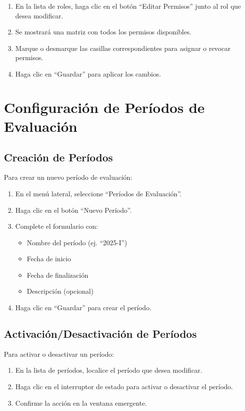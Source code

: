 \documentclass[12pt,a4paper]{book}
\begin{document}
\begin{enumerate}
    \item En la lista de roles, haga clic en el botón ``Editar Permisos'' junto al rol que desea modificar.
    \item Se mostrará una matriz con todos los permisos disponibles.
    \item Marque o desmarque las casillas correspondientes para asignar o revocar permisos.
    \item Haga clic en ``Guardar'' para aplicar los cambios.
\end{enumerate}

\section{Configuración de Períodos de Evaluación}
\subsection{Creación de Períodos}
Para crear un nuevo período de evaluación:

\begin{enumerate}
    \item En el menú lateral, seleccione ``Períodos de Evaluación''.
    \item Haga clic en el botón ``Nuevo Período''.
    \item Complete el formulario con:
    \begin{itemize}
        \item Nombre del período (ej. ``2025-I'')
        \item Fecha de inicio
        \item Fecha de finalización
        \item Descripción (opcional)
    \end{itemize}
    \item Haga clic en ``Guardar'' para crear el período.
\end{enumerate}

\subsection{Activación/Desactivación de Períodos}
Para activar o desactivar un período:

\begin{enumerate}
    \item En la lista de períodos, localice el período que desea modificar.
    \item Haga clic en el interruptor de estado para activar o desactivar el período.
    \item Confirme la acción en la ventana emergente.
\end{enumerate}
\end{document}
